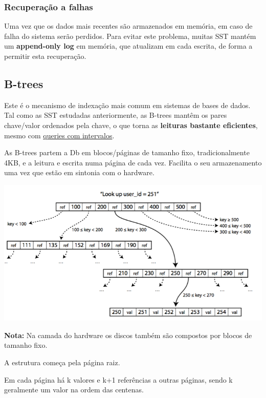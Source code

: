 \documentclass{article}
\begin{document}
\pagebreak

\subsubsection{Recuperação a falhas}

Uma vez que os dados mais recentes são armazenados em memória, em caso de falha do
sistema serão perdidos. Para evitar este problema, muitas SST mantém um \textbf{append-only log} em
memória, que atualizam em cada escrita, de forma a permitir esta recuperação.

\subsection{B-trees}

Este é o mecanismo de indexação mais comum em sistemas de bases de dados. Tal como as
SST estudadas anteriormente, as B-trees mantêm os pares chave/valor ordenados pela chave,
o que torna as \textbf{leituras bastante eficientes}, mesmo com
\uline{queries com intervalos}.

As B-trees partem a Db em blocos/páginas de tamanho fixo,
tradicionalmente 4KB, e a leitura e escrita numa página de cada vez.
Facilita o seu armazenamento uma vez que estão em sintonia com o
hardware.

\begin{center}
  \includegraphics[scale=0.3]{46}
\end{center}

\begin{flushleft}
  \textbf{Nota:} Na camada do
  hardware os discos também são compostos por blocos de
  tamanho fixo.
\end{flushleft}

A estrutura começa pela página raiz.

Em cada página há k valores e k+1 referências a outras
páginas, sendo k geralmente um valor na ordem das
centenas.
\end{document}

